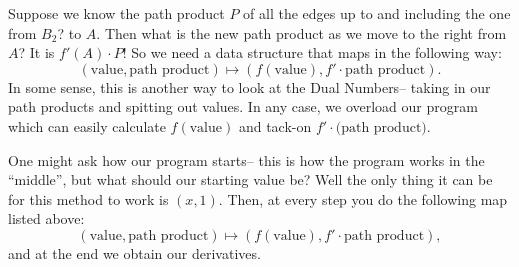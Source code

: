 Suppose we know the path product $P$ of all the edges up to and including the one from $B_2$?
to $A$. Then what is the new path product as we move to the right from $A$?  It is  $f'(A)\cdot P$! So we need a data structure that maps in the following way: 
\[
(\text{value}, \text{path product}) \mapsto (f(\text{value}), f'\cdot \text{path product}).
\]
In some sense, this is another way to look at the Dual Numbers-- taking in our path products and spitting out values. In any case, we overload our program which can easily calculate $f(\text{value})$ and tack-on $f'\cdot \text{(path product)}$.

One might ask how our program starts-- this is how the program works in the ``middle'', but what should our starting value be? Well the only thing it can be for this method to work is $(x, 1)$. Then, at every step you do the following map listed above: 
\[
(\text{value}, \text{path product}) \mapsto (f(\text{value}), f'\cdot \text{path product}),
\]
and at the end we obtain our derivatives.

